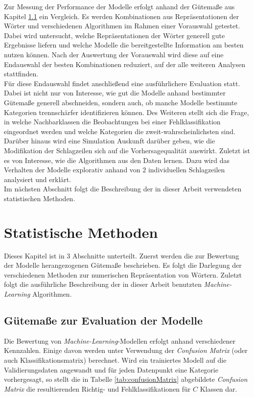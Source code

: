 \documentclass[a4paper,11pt]{article}
\begin{document}
Zur Messung der Performance der Modelle erfolgt anhand der Gütemaße aus Kapitel \ref{kap:guetemass} ein Vergleich. 
Es werden Kombinationen aus Repräsentationen der Wörter und verschiedenen Algorithmen im Rahmen einer Vorauswahl getestet. Dabei wird untersucht, welche Repräsentationen der Wörter generell gute Ergebnisse liefern und welche Modelle die bereitgestellte Information am besten nutzen können. Nach der Auswertung der Vorauswahl wird diese auf eine Endauswahl der besten Kombinationen reduziert, auf der alle weiteren Analysen stattfinden.\\
Für diese Endauswahl findet anschließend eine ausführlichere Evaluation statt. Dabei ist nicht nur von Interesse, wie gut die Modelle anhand bestimmter Gütemaße generell abschneiden, sondern auch, ob manche Modelle bestimmte Kategorien trennschärfer identifizieren können. Des Weiteren stellt sich die Frage, in welche Nachbarklassen die Beobachtungen bei einer Fehlklassifikation eingeordnet werden und welche Kategorien die zweit-wahrscheinlichsten sind. Darüber hinaus wird eine Simulation Auskunft darüber geben, wie die Modifikation der Schlagzeilen sich auf die Vorhersagequalität auswirkt. Zuletzt ist es von Interesse, wie die Algorithmen aus den Daten lernen. Dazu wird das Verhalten der Modelle explorativ anhand von $2$ individuellen Schlagzeilen analysiert und erklärt.\\
Im nächsten Abschnitt folgt die Beschreibung der in dieser Arbeit verwendeten statistischen Methoden.


\newpage



\section{Statistische Methoden}\label{kap:3}

Dieses Kapitel ist in $3$ Abschnitte unterteilt. Zuerst werden die zur Bewertung der Modelle herangezogenen Gütemaße beschrieben. Es folgt die Darlegung der verschiedenen Methoden zur numerischen Repräsentation von Wörtern. Zuletzt folgt die ausführliche Beschreibung der in dieser Arbeit benutzten \textit{Machine-Learning} Algorithmen.

\subsection{Gütemaße zur Evaluation der Modelle}\label{kap:guetemass}

Die Bewertung von \textit{Machine-Learning}-Modellen erfolgt anhand verschiedener Kennzahlen. Einige davon werden unter Verwendung der \textit{Confusion Matrix} (oder auch Klassifikationsmatrix) berechnet. Wird ein trainiertes Modell auf die Validierungsdaten angewandt und für jeden Datenpunkt eine Kategorie vorhergesagt, so stellt die in Tabelle \ref{tab:confusionMatrix} abgebildete \textit{Confusion Matrix} die resultierenden Richtig- und Fehlklassifikationen für $C$ Klassen dar.
\end{document}
